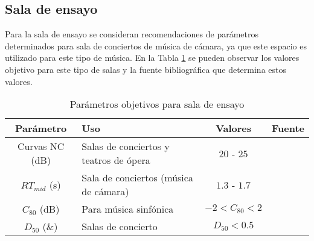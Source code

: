 \subsection{Sala de ensayo}
Para la sala de ensayo se consideran recomendaciones de parámetros determinados para sala de conciertos de música de cámara, ya que este espacio es utilizado para este tipo de música. En la Tabla \ref{tab: parametros objetivos sala de ensayo} se pueden observar los valores objetivo para este tipo de salas y la fuente bibliográfica que determina estos valores.
\begin{table}[H]
    \centering
    \begin{tabular}{|c|l|c|c|}
    \hline
    \textbf{Parámetro} & \textbf{Uso}                           & \textbf{Valores} & \textbf{Fuente}  \\ \hline
    Curvas NC (dB)          & Salas de conciertos y teatros de ópera & $20$ - $25$      & \cite{Recuero} \\ \hline
    $RT_{mid}$ (s)        & Sala de conciertos (música de cámara)  & $1.3$ - $1.7$    & \cite{carrion1990diseno} \\ \hline
    $C_{80}$ (dB)          & Para música sinfónica                  & $-2<C_{80}<2$    &  \cite{marshall1994}  \\ \hline   
    $D_{50}$ (\&)           & Salas de concierto                     & $D_{50}<0.5$     &  \cite{Thiele:1953:1610-1928:291} \\ \hline
    \end{tabular}
    \caption{Parámetros objetivos para sala de ensayo}
    \label{tab: parametros objetivos sala de ensayo}
\end{table}